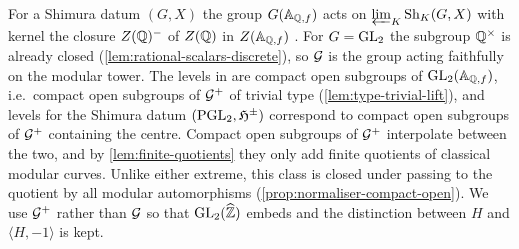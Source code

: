 \begin{remark}\label{rem:shimura-varieties}
For a Shimura datum $(G, X)$ the group $G(\mathbb{A}_{\mathbb{Q},f})$ acts on
$\varprojlim_K \mathrm{Sh}_K(G,X)$ with kernel the closure $Z(\mathbb{Q})^{-}$ of
$Z(\mathbb{Q})$ in $Z(\mathbb{A}_{\mathbb{Q},f})$ \cite{DeligneVarietes1979,Milne2005}.
For $G = \GL{2}{}$ the subgroup $\mathbb{Q}^{\times}$ is already closed
(\cref{lem:rational-scalars-discrete}), so $\mathcal{G}$ is the group
acting faithfully on the modular tower. The levels in
\cite{Milne2005,DeligneRapoport1973} are compact open subgroups of
$\GL{2}{\FiniteAdeles{\QQ}}$, i.e.\ compact open subgroups of $\mathcal{G}^{+}$
of trivial type (\cref{lem:type-trivial-lift}), and levels for the Shimura
datum $(\PGL{2}{}, \UpperHalfPlane^{\pm})$ correspond to compact open
subgroups of $\mathcal{G}^{+}$ containing the centre. Compact open subgroups
of $\mathcal{G}^{+}$ interpolate between the two, and by
\cref{lem:finite-quotients} they only add finite quotients of classical
modular curves. Unlike either extreme, this class is closed under
passing to the quotient by all modular automorphisms
(\cref{prop:normaliser-compact-open}). We use $\mathcal{G}^{+}$ rather than
$\mathcal{G}$ so that $\GL{2}{\ProfiniteIntegers}$ embeds and the
distinction between $H$ and $\langle H, -1\rangle$ is kept.
\end{remark}
